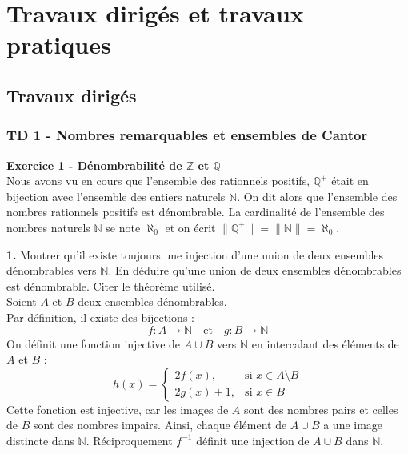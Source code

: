 \chapter{Travaux dirig\'es et travaux pratiques}\label{chap:td_tp}

    \section{Travaux dirig\'es}\label{sec:exos}
    \subsection{TD 1 - Nombres remarquables et ensembles de Cantor}\label{td_1}
    \hspace*{-2.65cm}\textbf{Exercice 1 - Dénombrabilité de \(\mathbb{Z}\) et \(\mathbb{Q}\)}\\
    Nous avons vu en cours que l'ensemble des rationnels positifs, \(\mathbb{Q^+}\) était en bijection avec l'ensemble des entiers naturels \(\mathbb{N}\). On dit alors que l'ensemble des nombres rationnels positifs est dénombrable. La cardinalité de l'ensemble des nombres naturels \(\mathbb{N}\) se note \(\aleph_0\) et on écrit \(\|\mathbb{Q^+}\|=\|\mathbb{N}\|=\aleph_0\).\par

    
    \hspace*{-1.5em}\textbf{1.} Montrer qu'il existe toujours une injection d'une union de deux ensembles dénombrables vers \(\mathbb{N}\). En déduire qu'une union de deux ensembles dénombrables est dénombrable. Citer le théorème utilisé.\\
    \noindent\makebox[\linewidth]{\rule{\linewidth}{0.4pt}}
    Soient \( A \) et \( B \) deux ensembles dénombrables.\\
    Par d\'efinition, il existe des bijections :  
    \begin{equation}
        f: A \to \mathbb{N} \quad \text{et} \quad g: B \to \mathbb{N}
    \end{equation}
    On d\'efinit une fonction injective de \( A \cup B \) vers \( \mathbb{N} \) en intercalant des \'el\'ements de \( A \) et \( B \) :
    \begin{equation}
        h(x) =
        \begin{cases}
            2f(x), & \text{si } x \in A \setminus B\\
            2g(x) + 1, & \text{si } x \in B
        \end{cases}
    \end{equation}
    Cette fonction est injective, car les images de \( A \) sont des nombres pairs et celles de \( B \) sont des nombres impairs. Ainsi, chaque \'el\'ement de \( A \cup B \) a une image distincte dans \( \mathbb{N} \).
    Réciproquement \(f^{-1}\) définit une injection de \(A\cup B\) dans \(\mathbb{N}\).

